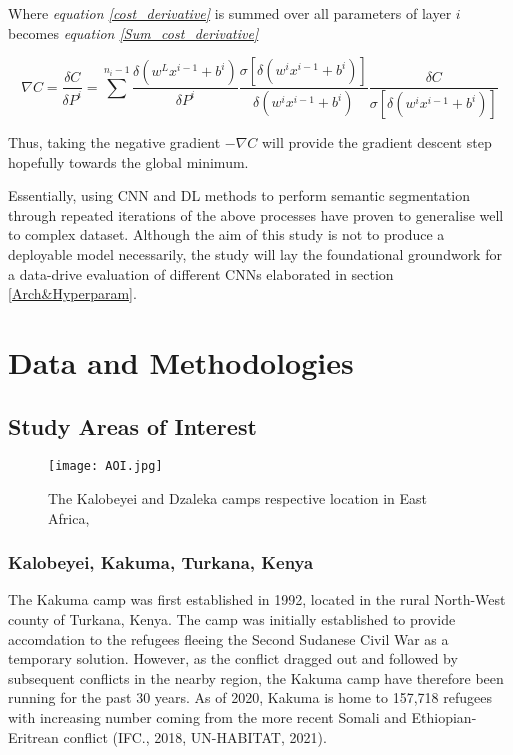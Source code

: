 \documentclass[11pt, a4paper, twoside]{report}
\begin{document}
Where \textit{equation \ref{cost_derivative}} is summed over all parameters of layer $i$ becomes \textit{equation \ref{Sum_cost_derivative}}\\\par

\begin{equation}
  \label{Sum_cost_derivative}
  \nabla C = \frac{\delta C}{\delta P^{i}} = \sum^{n_{i}-1} \frac{\delta(w^{L}x^{i-1} + b^{i})}{\delta P^{i}} \frac{\sigma[\delta(w^{i}x^{i-1} + b^{i})]}{\delta (w^{i}x^{i-1} + b^{i})} \frac{\delta C}{\sigma[\delta(w^{i}x^{i-1} + b^{i})]}
\end{equation}

Thus, taking the negative gradient $-\nabla C$ will provide the gradient descent step hopefully towards the global minimum.\\\par

Essentially, using CNN and DL methods to perform semantic segmentation through repeated iterations of the above processes have proven to generalise well to complex dataset. Although the aim of this study is not to produce a deployable model necessarily, the study will lay the foundational groundwork for a data-drive evaluation of different CNNs elaborated in section \ref{Arch&Hyperparam}.\\\par

\newpage

\chapter{Data and Methodologies}\label{DataandMethods}

\section{Study Areas of Interest}\label{AOI}

\begin{figure}[H]
  \centering
  \texttt{[image: AOI.jpg]}
  \caption{The Kalobeyei and Dzaleka camps respective location in East Africa,}
  \label{fig:AOI}
\end{figure}

\subsection{Kalobeyei, Kakuma, Turkana, Kenya}\label{Kalobeyei}

The Kakuma camp was first established in 1992, located in the rural North-West county of Turkana, Kenya. The camp was initially established to provide accomdation to the refugees fleeing the Second Sudanese Civil War as a temporary solution. However, as the conflict dragged out and followed by subsequent conflicts in the nearby region, the Kakuma camp have therefore been running for the past 30 years. As of 2020, Kakuma is home to 157,718 refugees with increasing number coming from the more recent Somali and Ethiopian-Eritrean conflict (IFC., 2018, UN-HABITAT, 2021).\\\par
\end{document}
